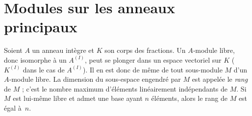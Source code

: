 \documentclass[11pt, useosf,
  title in boldface,
  theorem in new line,
  theorem numbering = section,
  number theorems separately,
]{simplivre}
\begin{document}
\section{Modules sur les anneaux principaux}

    Soient \( A \) un anneau intègre et \( K \) son corps des fractions. Un \( A \)‑module libre, donc isomorphe à un \( A^{(I)} \), peut se plonger dans un espace vectoriel sur \( K \) (\( K^{(I)} \) dans le cas de \( A^{(I)} \)). Il en est donc de même de tout sous-module \( M \) d'un \( A \)‑module libre. La dimension du sous-espace engendré par \( M \) est appelée le \emph{rang} de \( M \) ; c'est le nombre maximum d'éléments linéairement indépendants de \( M \). Si \( M \) est lui-même libre et admet une base ayant \( n \) éléments, alors le rang de \( M \) est égal à~\( n \).
\end{document}
